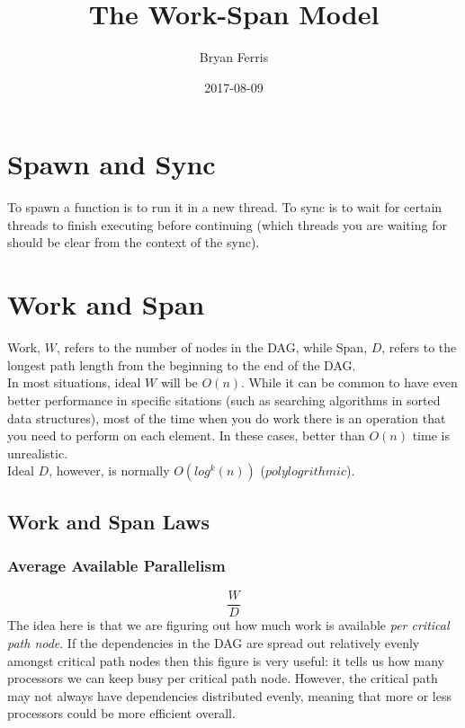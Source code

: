 \documentclass{standalone}
\title{The Work-Span Model}
\date{2017-08-09}
\author{Bryan Ferris}
\begin{document}
\ifstandalone
\maketitle
{}

\newpage
{}
\fi

\section{Spawn and Sync}
To spawn a function is to run it in a new thread. To sync is to wait for certain threads to finish executing before continuing (which threads you are waiting for should be clear from the context of the sync).

\section{Work and Span}
Work, $W$, refers to the number of nodes in the DAG, while Span, $D$, refers to the longest path length from the beginning to the end of the DAG.\\

In most situations, ideal $W$ will be $O(n)$. While it can be common to have even better performance in specific sitations (such as searching algorithms in sorted data structures), most of the time when you do work there is an operation that you need to perform on each element. In these cases, better than $O(n)$ time is unrealistic.\\

Ideal $D$, however, is normally $O(log^k(n))$ ($polylogrithmic$).

\subsection{Work and Span Laws}
\subsubsection{Average Available Parallelism}
\[\frac{W}{D}\]
The idea here is that we are figuring out how much work is available \textit{per critical path node}. If the dependencies in the DAG are spread out relatively evenly amongst critical path nodes then this figure is very useful: it tells us how many processors we can keep busy per critical path node. However, the critical path may not always have dependencies distributed evenly, meaning that more or less processors could be more efficient overall.
\end{document}
